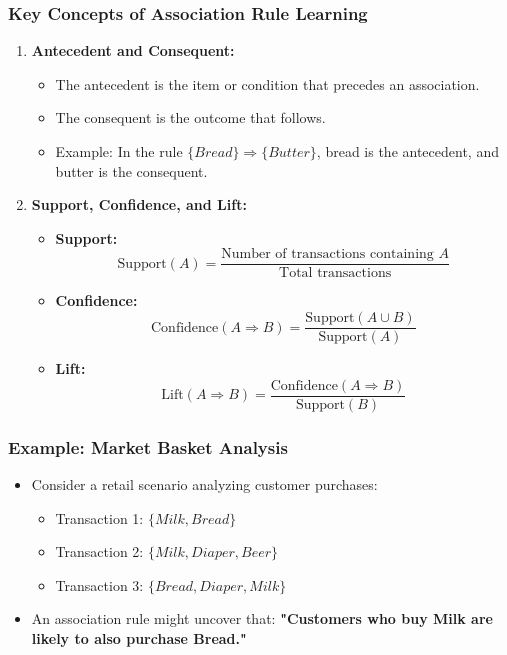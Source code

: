 \documentclass{beamer}
\begin{document}
\begin{frame}[fragile]
    \frametitle{Key Concepts of Association Rule Learning}
    \begin{enumerate}
        \item \textbf{Antecedent and Consequent:}
        \begin{itemize}
            \item The antecedent is the item or condition that precedes an association.
            \item The consequent is the outcome that follows.
            \item Example: In the rule $\{Bread\} \Rightarrow \{Butter\}$, bread is the antecedent, and butter is the consequent.
        \end{itemize}
        
        \item \textbf{Support, Confidence, and Lift:}
        \begin{itemize}
            \item \textbf{Support:} 
            \begin{equation}
                \text{Support}(A) = \frac{\text{Number of transactions containing } A}{\text{Total transactions}}
            \end{equation}
            \item \textbf{Confidence:} 
            \begin{equation}
                \text{Confidence}(A \Rightarrow B) = \frac{\text{Support}(A \cup B)}{\text{Support}(A)}
            \end{equation}
            \item \textbf{Lift:} 
            \begin{equation}
                \text{Lift}(A \Rightarrow B) = \frac{\text{Confidence}(A \Rightarrow B)}{\text{Support}(B)}
            \end{equation}
        \end{itemize}
    \end{enumerate}
\end{frame}

\begin{frame}[fragile]
    \frametitle{Example: Market Basket Analysis}
    \begin{itemize}
        \item Consider a retail scenario analyzing customer purchases:
            \begin{itemize}
                \item Transaction 1: $\{Milk, Bread\}$
                \item Transaction 2: $\{Milk, Diaper, Beer\}$
                \item Transaction 3: $\{Bread, Diaper, Milk\}$
            \end{itemize}
        \item An association rule might uncover that:
            \textbf{"Customers who buy Milk are likely to also purchase Bread."}
    \end{itemize}
\end{frame}
\end{document}
